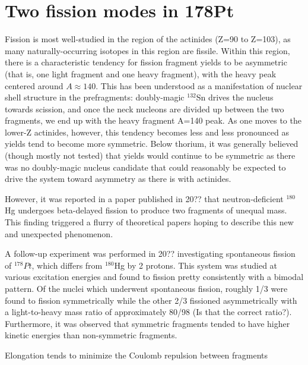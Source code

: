 \chapter{Two fission modes in 178Pt}\label{chap:178Pt}

\maketitle

Fission is most well-studied in the region of the actinides (Z=90 to Z=103), as many naturally-occurring isotopes in this region are fissile. Within this region, there is a characteristic tendency for fission fragment yields to be asymmetric (that is, one light fragment and one heavy fragment), with the heavy peak centered around $A\approx140$. This has been understood as a manifestation of nuclear shell structure in the prefragments: doubly-magic $^{132}$Sn drives the nucleus towards scission, and once the neck nucleons are divided up between the two fragments, we end up with the heavy fragment A=140 peak. As one moves to the lower-Z actinides, however, this tendency becomes less and less pronounced as yields tend to become more symmetric. Below thorium, it was generally believed (though mostly not tested) that yields would continue to be symmetric as there was no doubly-magic nucleus candidate that could reasonably be expected to drive the system toward asymmetry as there is with actinides.

However, it was reported in a paper published in 20?? \cite{Andreyev20??} that neutron-deficient $^{180}$Hg undergoes beta-delayed fission to produce two fragments of unequal mass. This finding triggered a flurry of theoretical papers hoping to describe this new and unexpected phenomenon.

A follow-up experiment was performed in 20?? \cite{our-Pt-paper} investigating spontaneous fission of $^{178}Pt$, which differs from $^{180}$Hg by 2 protons. This system was studied at various excitation energies and found to fission pretty consistently with a bimodal pattern. Of the nuclei which underwent spontaneous fission, roughly 1/3 were found to fission symmetrically while the other 2/3 fissioned asymmetrically with a light-to-heavy mass ratio of approximately 80/98 (Is that the correct ratio?). Furthermore, it was observed that symmetric fragments tended to have higher kinetic energies than non-symmetric fragments. 



Elongation tends to minimize the Coulomb repulsion between fragments